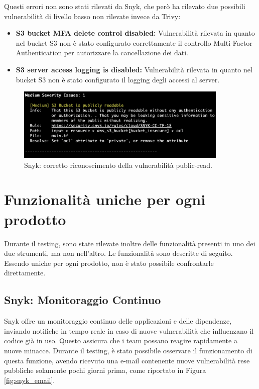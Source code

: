 Questi errori non sono stati rilevati da Snyk, che però ha rilevato due possibili vulnerabilità di livello basso non rilevate invece da Trivy:
\begin{itemize}
   \item \textbf{S3 bucket MFA delete control disabled:} Vulnerabilità rilevata in quanto nel bucket S3 non è stato configurato correttamente il controllo Multi-Factor Authentication per autorizzare la cancellazione dei dati.
   \item \textbf{S3 server access logging is disabled:} Vulnerabilità rilevata in quanto nel bucket S3 non è stato configurato il logging degli accessi al server.
\end{itemize}
\begin{figure}[H]
   \centering
   \includegraphics[width=0.9\textwidth]{immagini/capitolo2/snyk_iac.png}
   \caption{Snyk: corretto riconoscimento della vulnerabilità public-read.}
   \label{fig:snyk_iac}
\end{figure}


\section{Funzionalità uniche per ogni prodotto}
Durante il testing, sono state rilevate inoltre delle funzionalità presenti in uno dei due strumenti, ma non nell'altro. Le funzionalità sono descritte di seguito. Essendo uniche per ogni prodotto, non è stato possibile confrontarle direttamente.

\subsection{Snyk: Monitoraggio Continuo}
Snyk offre un monitoraggio continuo delle applicazioni e delle dipendenze, inviando notifiche in tempo reale in caso di nuove vulnerabilità che influenzano il codice già in uso. Questo assicura che i team possano reagire rapidamente a nuove minacce. Durante il testing, è stato possibile osservare il funzionamento di questa funzione, avendo ricevuto una e-mail contenente nuove vulnerabilità rese pubbliche solamente pochi giorni prima, come riportato in Figura \ref{fig:snyk_email}.


